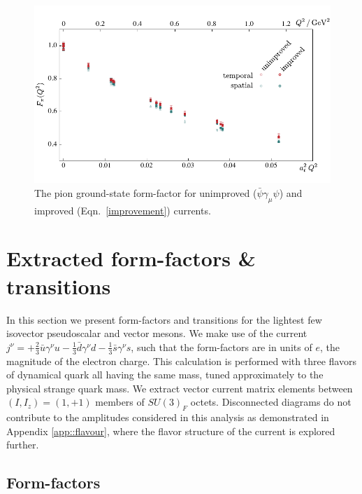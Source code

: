 \documentclass[twocolumn,amsmath,amssymb,prd,10pt,floatfix, 
superscriptaddress,nofootinbib, showpacs, preprintnumbers]{revtex4-1}
\begin{document}
\begin{figure}[b]
\includegraphics[width=\linewidth]{fig11.pdf}
\caption{The pion ground-state form-factor for unimproved ($\bar{\psi} \gamma_\mu \psi$) and improved (Eqn.~\ref{improvement}) currents.
\label{fig::pi_improvement}}
\end{figure}


\pagebreak



%
\section{Extracted form-factors \& transitions\label{sec::results}}

In this section we present form-factors and transitions for the lightest few isovector pseudoscalar and vector mesons. We make use of the current ${  j^\nu = +\frac{2}{3}\bar{u}\gamma^\nu u -\frac{1}{3}\bar{d}\gamma^\nu d -\frac{1}{3}\bar{s}\gamma^\nu s  }$, such that the form-factors are in units of $e$, the magnitude of the electron charge. This calculation is performed with three flavors of dynamical quark all having the same mass, tuned approximately to the physical strange quark mass. We extract vector current matrix elements between ${(I,I_z) = (1,+1)}$ members of $SU(3)_F$ octets. Disconnected diagrams do not contribute to the amplitudes considered in this analysis as demonstrated in Appendix \ref{app::flavour}, where the flavor structure of the current is explored further.

\subsection{Form-factors}
\end{document}
